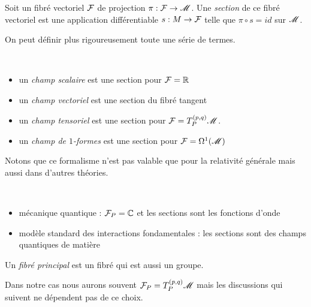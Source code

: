 \documentclass[a4paper,11pt]{report}
\begin{document}
                \begin{definition}
                    Soit un fibré vectoriel $\mathcal{F}$ de projection $\pi:\mathcal{F}\to\mathscr{M}$. Une \textit{section} de ce fibré vectoriel est une application différentiable $s:M\to\mathcal{F}$ telle que $\pi\circ s = id$ sur $\mathscr{M}$.
                \end{definition}
                
                On peut définir plus rigoureusement toute une série de termes.
                \begin{definition}${}$
                    \begin{itemize}[label = \textbullet]
                        \item un \textit{champ scalaire} est une section pour $\mathcal{F} = \mathbb{R}$
                        \item un \textit{champ vectoriel} est une section du fibré tangent
                        \item un \textit{champ tensoriel} est une section pour $\mathcal{F} = T_P^{(p,q)}\mathscr{M}$.
                        \item un \textit{champ de $1$-formes} est une section pour $\mathcal{F} = \Omega^1(\mathscr{M})$
                    \end{itemize}
                \end{definition}
                
                Notons que ce formalisme n'est pas valable que pour la relativité générale mais aussi dans d'autres théories.
                
                \begin{exmp}${}$
                    \begin{itemize}[label = \textbullet]
                        \item mécanique quantique : $\mathcal{F}_P = \mathbb{C}$ et les sections sont les fonctions d'onde
                        \item modèle standard des interactions fondamentales : les sections sont des champs quantiques de matière
                    \end{itemize}
                \end{exmp}
                
                \begin{definition}
                    Un \textit{fibré principal} est un fibré qui est aussi un groupe.
                \end{definition}
                
                Dans notre cas nous aurons souvent $\mathcal{F}_P = T_P^{(p,q)}\mathscr{M}$ mais les discussions qui suivent ne dépendent pas de ce choix.\\
                
\end{document}
